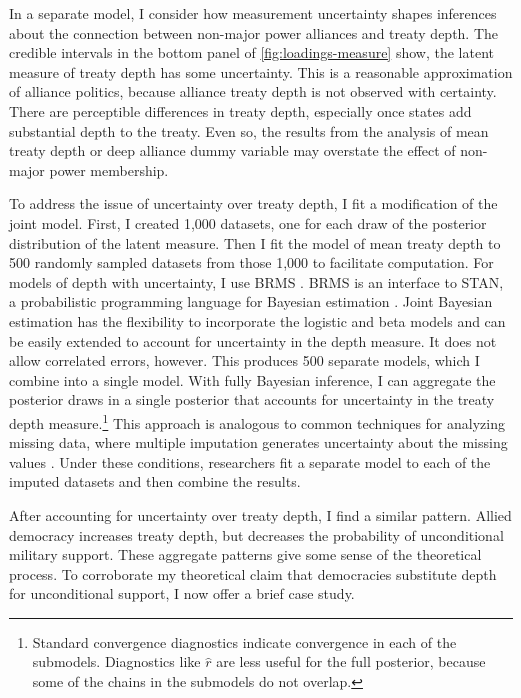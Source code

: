 \documentclass[12pt]{article}
\begin{document}
In a separate model, I consider how measurement uncertainty shapes inferences about the connection between non-major power alliances and treaty depth. 
The credible intervals in the bottom panel of \autoref{fig:loadings-measure} show, the latent measure of treaty depth has some uncertainty. 
This is a reasonable approximation of alliance politics, because alliance treaty depth is not observed with certainty. 
There are perceptible differences in treaty depth, especially once states add substantial depth to the treaty. 
Even so, the results from the analysis of mean treaty depth or deep alliance dummy variable may overstate the effect of non-major power membership. 


To address the issue of uncertainty over treaty depth, I fit a modification of the joint model. 
First, I created 1,000 datasets, one for each draw of the posterior distribution of the latent measure.
Then I fit the model of mean treaty depth to 500 randomly sampled datasets from those 1,000 to facilitate computation. 
For models of depth with uncertainty, I use BRMS \citep{Buerkner2017}. 
BRMS is an interface to STAN, a probabilistic programming language for Bayesian estimation \citep{Carpenteretal2016}. 
Joint Bayesian estimation has the flexibility to incorporate the logistic and beta models and can be easily extended to account for uncertainty in the depth measure. 
It does not allow correlated errors, however.
This produces 500 separate models, which I combine into a single model. 
With fully Bayesian inference, I can aggregate the posterior draws in a single posterior that accounts for uncertainty in the treaty depth measure.\footnote{Standard convergence diagnostics indicate convergence in each of the submodels. Diagnostics like $\hat{r}$ are less useful for the full posterior, because some of the chains in the submodels do not overlap.}
This approach is analogous to common techniques for analyzing missing data, where multiple imputation generates uncertainty about the missing values \citep{Hollenbachetal2018imp}.
Under these conditions, researchers fit a separate model to each of the imputed datasets and then combine the results. 


After accounting for uncertainty over treaty depth, I find a similar pattern. 
Allied democracy increases treaty depth, but decreases the probability of unconditional military support. 
These aggregate patterns give some sense of the theoretical process. 
To corroborate my theoretical claim that democracies substitute depth for unconditional support, I now offer a brief case study. 
\end{document}
